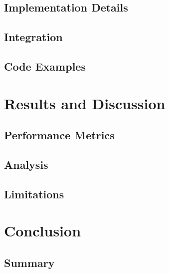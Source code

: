 \documentclass[12pt,oneside,a4paper]{article}
\begin{document}
\subsection{Implementation Details}

\subsection{Integration}

\subsection{Code Examples}


\section{Results and Discussion} 

\subsection{Performance Metrics}

\subsection{Analysis}

\subsection{Limitations}


\section{Conclusion} 

\subsection{Summary}
\end{document}
